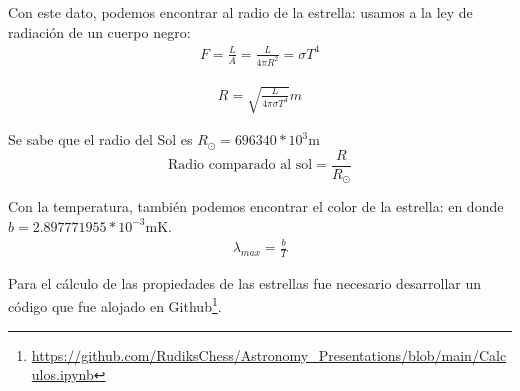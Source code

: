 Con este dato, podemos encontrar al radio de la estrella: usamos a la ley de radiación de un cuerpo negro:
\begin{align}
    F=\frac{L}{A}=\frac{L}{4\pi R^2}=\sigma T^4
\end{align}

\begin{align}
    R=\sqrt{\frac{L}{4\pi \sigma T^4}}m
\end{align}

Se sabe que el radio del Sol es $R_\odot=696340*10^3$m
\begin{equation*}
    \text{Radio comparado al sol}=\frac{R}{R_\odot}
\end{equation*}

Con la temperatura, también podemos encontrar el color de la estrella: en donde $b=2.897771955*10^{-3}$mK.
\begin{align}
    \lambda_{max}=\frac{b}{T}
\end{align}

Para el cálculo de las propiedades de las estrellas fue necesario desarrollar un código que fue alojado en Github\footnote{\url{https://github.com/RudiksChess/Astronomy_Presentations/blob/main/Calculos.ipynb}}.